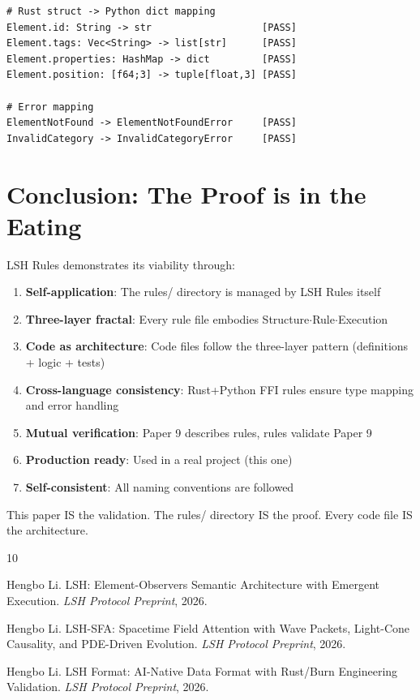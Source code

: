 \documentclass{article}
\begin{document}
\begin{lstlisting}[caption={FFI consistency verification}]
# Rust struct -> Python dict mapping
Element.id: String -> str                   [PASS]
Element.tags: Vec<String> -> list[str]      [PASS]
Element.properties: HashMap -> dict         [PASS]
Element.position: [f64;3] -> tuple[float,3] [PASS]

# Error mapping
ElementNotFound -> ElementNotFoundError     [PASS]
InvalidCategory -> InvalidCategoryError     [PASS]
\end{lstlisting}

\section{Conclusion: The Proof is in the Eating}

LSH Rules demonstrates its viability through:

\begin{enumerate}
    \item \textbf{Self-application}: The rules/ directory is managed by LSH Rules itself
    \item \textbf{Three-layer fractal}: Every rule file embodies Structure$\cdot$Rule$\cdot$Execution
    \item \textbf{Code as architecture}: Code files follow the three-layer pattern (definitions + logic + tests)
    \item \textbf{Cross-language consistency}: Rust+Python FFI rules ensure type mapping and error handling
    \item \textbf{Mutual verification}: Paper 9 describes rules, rules validate Paper 9
    \item \textbf{Production ready}: Used in a real project (this one)
    \item \textbf{Self-consistent}: All naming conventions are followed
\end{enumerate}

This paper IS the validation. The rules/ directory IS the proof. Every code file IS the architecture.


\begin{thebibliography}{10}

Hengbo Li.
\newblock LSH: Element-Observers Semantic Architecture with Emergent Execution.
\newblock \emph{LSH Protocol Preprint}, 2026.

Hengbo Li.
\newblock LSH-SFA: Spacetime Field Attention with Wave Packets, Light-Cone Causality, and PDE-Driven Evolution.
\newblock \emph{LSH Protocol Preprint}, 2026.

Hengbo Li.
\newblock LSH Format: AI-Native Data Format with Rust/Burn Engineering Validation.
\newblock \emph{LSH Protocol Preprint}, 2026.

\end{thebibliography}
\end{document}
